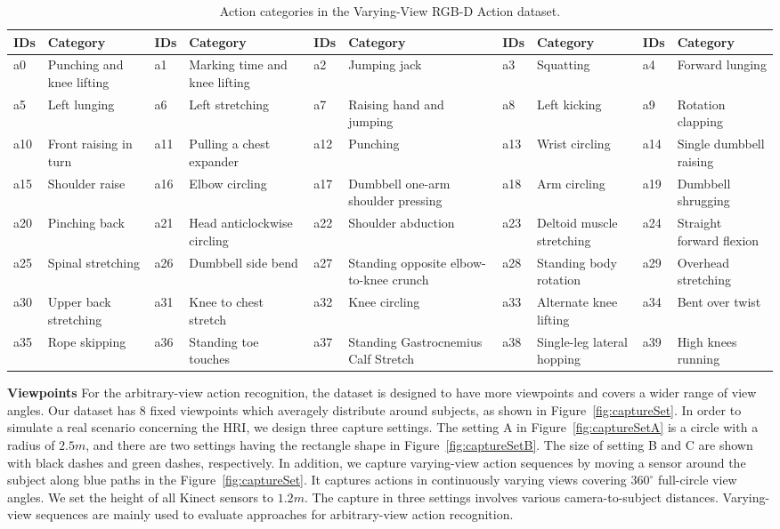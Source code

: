 \documentclass[journal]{IEEEtran}
\begin{document}
\begin{table*} \footnotesize
\begin{center}
\caption{Action categories in the Varying-View RGB-D Action dataset.}
\label{tab:category}
\begin{tabular}{|p{0.5cm}|p{2cm}|p{0.5cm}|p{2cm}|p{0.5cm}|p{2cm}|p{0.5cm}|p{2cm}|p{0.5cm}|p{2cm}|}
\hline
IDs & Category & IDs  & Category & IDs  & Category  & IDs  & Category  & IDs  & Category \\
\hline
 a0 & Punching and knee lifting & a1 & Marking time and knee lifting & a2 & Jumping jack  &  a3 & Squatting & a4 & Forward lunging \\
a5 & Left lunging & a6 & Left stretching  & a7 & Raising hand and jumping  & a8 & Left kicking  & a9  & Rotation clapping \\
a10 & Front raising in turn & a11 & Pulling a chest expander  & a12 & Punching  & a13 & Wrist circling  & a14 & Single dumbbell raising \\
a15 & Shoulder raise & a16 & Elbow circling  & a17 & Dumbbell one-arm shoulder pressing  & a18 & Arm circling  & a19 & Dumbbell shrugging \\
a20 & Pinching back & a21 & Head anticlockwise circling  & a22 & Shoulder abduction  & a23 & Deltoid muscle stretching  & a24 & Straight forward flexion \\
a25 & Spinal stretching & a26 & Dumbbell side bend  & a27 & Standing opposite elbow-to-knee crunch  & a28 & Standing body rotation  & a29 & Overhead stretching \\
a30 & Upper back stretching & a31 & Knee to chest stretch & a32 & Knee circling  & a33 & Alternate knee lifting  & a34 & Bent over twist \\
a35 & Rope skipping & a36 & Standing toe touches & a37 & Standing Gastrocnemius Calf Stretch & a38 & Single-leg lateral hopping  & a39 & High knees running \\
\hline
\end{tabular}
\end{center}
\end{table*}

\textbf{Viewpoints} For the arbitrary-view action recognition, the dataset is designed to have more viewpoints and covers a wider range of view angles. Our dataset has 8 fixed viewpoints which averagely distribute around subjects, as shown in Figure~\ref{fig:captureSet}.
In order to simulate a real scenario concerning the HRI, we design three capture settings. The setting A in Figure~\ref{fig:captureSetA} is a circle with a radius of $2.5 m$, and there are two settings having the rectangle shape in Figure~\ref{fig:captureSetB}. The size of setting B and C are shown with black dashes and green dashes, respectively. In addition, we capture varying-view action sequences by moving a sensor around the subject along blue paths in the Figure~\ref{fig:captureSet}. It captures actions in continuously varying views covering $360^\circ$ full-circle view angles. We set the height of all Kinect sensors to $1.2 m$. The capture in three settings involves various camera-to-subject distances. Varying-view sequences are mainly used to evaluate approaches for arbitrary-view action recognition.
\end{document}
